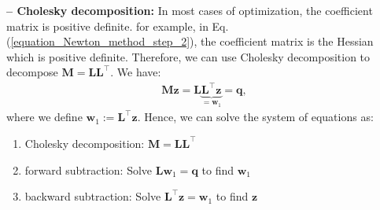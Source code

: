 \documentclass[lang=cn,10pt]{gorgeousnbook}
\numberwithin{equation}{section}%
\numberwithin{figure}{section}%
\begin{document}
\hfill\break
\textbf{-- Cholesky decomposition:}
In most cases of optimization, the coefficient matrix is positive definite. for example, in Eq. (\ref{equation_Newton_method_step_2}), the coefficient matrix is the Hessian which is positive definite. 
Therefore, we can use Cholesky decomposition to decompose $\boldsymbol{M} = \boldsymbol{L}\boldsymbol{L}^\top$. We have:
\begin{align*}
\boldsymbol{M z} = \boldsymbol{L}\underbrace{\boldsymbol{L}^\top \boldsymbol{z}}_{=\boldsymbol{w}_1} = \boldsymbol{q},
\end{align*}
where we define $\boldsymbol{w}_1 := \boldsymbol{L}^\top \boldsymbol{z}$. 
Hence, we can solve the system of equations as:
\begin{enumerate}
\item Cholesky decomposition: $\boldsymbol{M} = \boldsymbol{L}\boldsymbol{L}^\top$
\item forward subtraction: Solve $\boldsymbol{L}\boldsymbol{w}_1 = \boldsymbol{q}$ to find $\boldsymbol{w}_1$
\item backward subtraction: Solve $\boldsymbol{L}^\top \boldsymbol{z} = \boldsymbol{w}_1$ to find $\boldsymbol{z}$
\end{enumerate}
\end{document}
